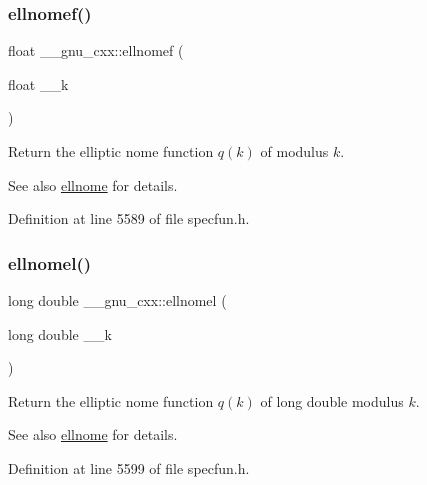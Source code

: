 \subsubsection{\texorpdfstring{ellnomef()}{ellnomef()}}
{\footnotesize\ttfamily float \+\_\+\+\_\+gnu\+\_\+cxx\+::ellnomef (\begin{DoxyParamCaption}\item[{float}]{\+\_\+\+\_\+k }\end{DoxyParamCaption})\hspace{0.3cm}{\ttfamily [inline]}}

Return the elliptic nome function $ q(k) $ of modulus $ k $.

\begin{DoxySeeAlso}{See also}
\hyperlink{group__gnu__math__spec__func_ga7bfb34f8b5c0ed7c72040f9cb7034bba}{ellnome} for details. 
\end{DoxySeeAlso}


Definition at line 5589 of file specfun.\+h.

\mbox{\label{group__gnu__math__spec__func_ga0774570b24f654f8ae39e1865613a4e2}} 
\subsubsection{\texorpdfstring{ellnomel()}{ellnomel()}}
{\footnotesize\ttfamily long double \+\_\+\+\_\+gnu\+\_\+cxx\+::ellnomel (\begin{DoxyParamCaption}\item[{long double}]{\+\_\+\+\_\+k }\end{DoxyParamCaption})\hspace{0.3cm}{\ttfamily [inline]}}

Return the elliptic nome function $ q(k) $ of {\ttfamily long double} modulus $ k $.

\begin{DoxySeeAlso}{See also}
\hyperlink{group__gnu__math__spec__func_ga7bfb34f8b5c0ed7c72040f9cb7034bba}{ellnome} for details. 
\end{DoxySeeAlso}


Definition at line 5599 of file specfun.\+h.

\mbox{\label{group__gnu__math__spec__func_gac956e6457ab7d0d1765d281e73073f55}} 
